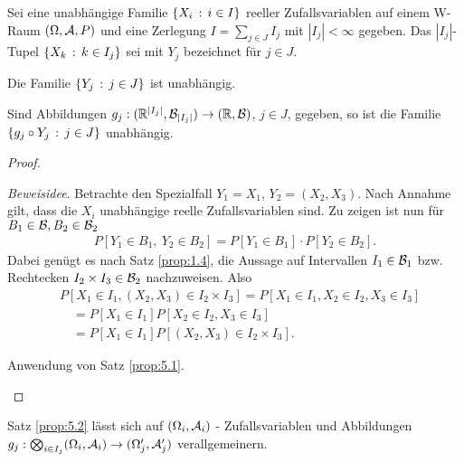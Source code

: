 \begin{prop}
\label{prop:5.2}
Sei eine unabhängige Familie $\setdef{X_{i}}{i\in I}$ reeller
Zufallsvariablen auf einem W-Raum $(\Omega, \AA, P)$ und eine Zerlegung
$I=\sum_{j\in J} I_{j} $ mit $|I_{j}| < \infty$ gegeben.
Das $|I_{j}|$-Tupel $\setdef{X_{k}}{k\in I_{j}}$ sei mit $Y_{j}$ bezeichnet für
$j\in J$.
\begin{propenum}
\item
Die Familie $\setdef{Y_{j}}{j\in J}$ ist unabhängig.
\item
Sind Abbildungen $g_{j} :(\R^{\abs{I_{j}}}, {\BB}_{\abs{
I_{j}}} )\to (\R, {\BB})$, $ j\in J$, gegeben,
so ist die Familie $\setdef{g_{j} \circ Y_{j}}{j\in J}$ unabhängig.\fishhere
\end{propenum}
\end{prop}
\begin{proof}
\begin{proofenum}
  \item \textit{Beweisidee}. Betrachte den Spezialfall $Y_1=X_1$,
  $Y_2=(X_2,X_3)$. Nach Annahme gilt, dass die $X_i$ unabhängige reelle
  Zufallsvariablen sind. Zu zeigen ist nun für $B_1\in\BB, B_2\in\BB_2$
\begin{align*}
P\left[Y_1 \in B_1,\ Y_2\in B_2\right] = P[Y_1\in B_1]\cdot P[Y_2\in B_2].
\end{align*}
Dabei genügt es nach Satz \ref{prop:1.4}, die Aussage auf Intervallen
$I_1\in\BB_1$ bzw. Rechtecken $I_2\times I_3\in\BB_2$ nachzuweisen. Also
\begin{align*}
& P\left[X_1\in I_1, (X_2,X_3)\in I_2\times I_3\right]
= P\left[X_1\in I_1, X_2\in I_2, X_3\in I_3 \right]\\
&\quad= P\left[X_1\in I_1\right]P\left[X_2\in I_2, X_3\in I_3 \right]\\
&\quad= P\left[X_1\in I_1\right]P\left[(X_2,X_3)\in I_2\times I_3\right].
\end{align*}
\item Anwendung von Satz \ref{prop:5.1}.\qedhere
\end{proofenum}
\end{proof}
 
\begin{bem}
\label{bem:5.3}
Satz \ref{prop:5.2} lässt sich auf $(\Omega_{i}, \AA_{i})$ - Zufallsvariablen
und Abbildungen $ g_{j}: \bigotimes_{i\in I_{j}}(\Omega_{i},
\AA_{i})\to (\Omega'_{j}, \AA'_{j})$ verallgemeinern.\maphere
\end{bem}

